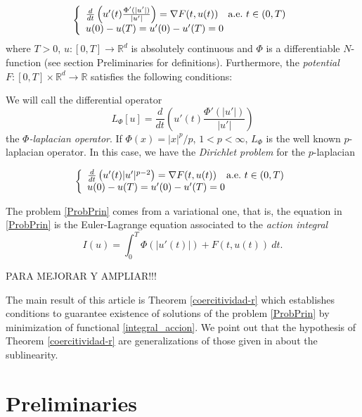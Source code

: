 \documentclass[twoside]{article}
\theoremstyle{remark}
\newcommand{\rr}{\mathbb{R}}
\begin{document}
\begin{equation}\label{ProbPrin}
    \left\{%
\begin{array}{ll}
   \frac{d}{dt}\left(u'(t)\frac{\Phi'(|u'|)}{|u'|}\right) = \nabla F(t,u(t)) \quad \hbox{a.e.}\ t \in (0,T)\\
    u(0)-u(T)=u'(0)-u'(T)=0
\end{array}%
\right.
\end{equation}
where $T>0$, $u:[0,T]\to\rr^d$ is absolutely continuous and  $\Phi$ is a differentiable  $N$-function (see section Preliminaries for definitions). Furthermore, the \emph{potential} $F:[0,T]\times\rr^d\to\rr$  satisfies the following conditions:


We will call the differential operator
\[L_{\Phi}[u]=\frac{d}{dt}\left(u'(t)\frac{\Phi'(|u'|)}{|u'|}\right) \]
the
\emph{$\Phi$-laplacian operator}. If $\Phi(x)=|x|^p/p$, $1<p<\infty$, $L_{\Phi}$ is the well known $p$-laplacian operator. In this case, we have the \emph{Dirichlet problem} for the $p$-laplacian

\begin{equation}\label{ProbP-lapla}
    \left\{%
\begin{array}{ll}
   \frac{d}{dt}\left(u'(t)|u'|^{p-2}\right) = \nabla F(t,u(t)) \quad \hbox{a.e.}\ t \in (0,T)\\
    u(0)-u(T)=u'(0)-u'(T)=0
\end{array}%
\right.
\end{equation}



The problem \eqref{ProbPrin} comes from a variational one, that is,  the equation in  \eqref{ProbPrin}  is the Euler-Lagrange equation associated to the \emph{action integral}
\begin{equation}\label{integral_accion}
I(u)=\int_{0}^T \Phi(|u'(t)|)+F(t,u(t))\ dt.
\end{equation}

PARA MEJORAR Y AMPLIAR!!!

The main result of this article is Theorem \ref{coercitividad-r} which establishes conditions to guarantee existence of 
solutions of the problem \eqref{ProbPrin} by minimization of functional \eqref{integral_accion}. 
We point out that the hypothesis of
Theorem \ref{coercitividad-r} are generalizations of those given in 
\cite{wu1999periodic,zhao2004periodic,zhao2005existence,tang2010periodic} about the sublinearity.


\section{Preliminaries}\label{preliminares}
\end{document}
